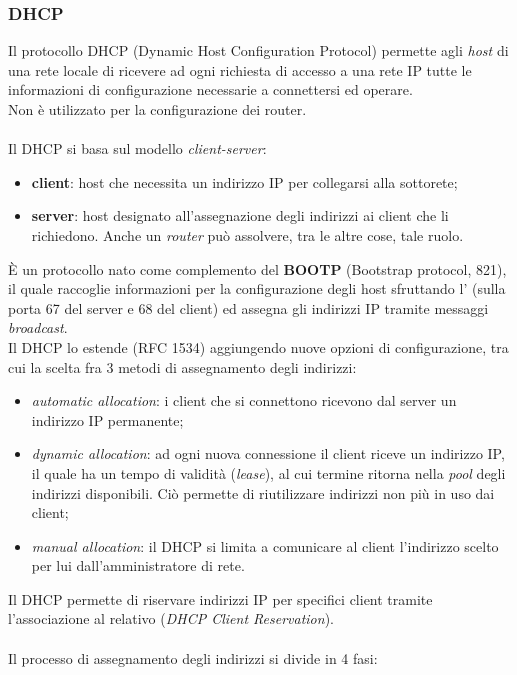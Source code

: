 \documentclass[a4paper,11pt]{article}
\def\subsub#1{\subsubsection{#1}\label{#1}}
\def\vedi#1{\nameref{#1}}
\def\italic#1{\textit{#1}}
\begin{document}
\subsub{DHCP} %
Il protocollo DHCP (Dynamic Host Configuration Protocol) permette agli \italic{host} di una rete locale di ricevere ad ogni richiesta di accesso a una rete IP tutte le informazioni di configurazione necessarie a connettersi ed operare.
\\Non è utilizzato per la configurazione dei router.
\\\\  Il DHCP si basa sul modello \italic{client-server}:
\begin{itemize}
	\item \textbf{client}:  host che necessita un indirizzo IP per collegarsi alla sottorete;
	\item \textbf{server}:  host designato all'assegnazione degli indirizzi ai client che li richiedono. Anche un \italic{router} può assolvere, tra le altre cose, tale ruolo.
\end{itemize}
È un protocollo nato come complemento del \textbf{BOOTP} (Bootstrap protocol, \vedi{RFC} 821), il quale raccoglie informazioni per la configurazione degli host sfruttando l'\vedi{UDP} (sulla porta 67 del server e 68 del client) ed assegna gli indirizzi IP tramite messaggi \italic{broadcast}.
\\Il DHCP lo estende (RFC 1534) aggiungendo nuove opzioni di configurazione, tra cui la scelta fra 3 metodi di assegnamento degli indirizzi:
\begin{itemize}
	\item \italic{automatic allocation}: i client che si connettono ricevono dal server un indirizzo IP permanente;
	\item \italic{dynamic allocation}: ad ogni nuova connessione il client riceve un indirizzo IP, il quale ha un tempo di validità (\italic{lease}), al cui termine ritorna nella \italic{pool} degli indirizzi disponibili. Ciò permette di riutilizzare indirizzi non più in uso dai client;
	\item \italic{manual allocation}: il DHCP si limita a comunicare al client l'indirizzo scelto per lui dall'amministratore di rete.
\end{itemize}
Il DHCP permette di riservare indirizzi IP per specifici client tramite l'associazione al relativo \vedi{Indirizzo MAC} (\italic{DHCP Client Reservation}).
\\\\Il processo di assegnamento degli indirizzi si divide in 4 fasi:
\end{document}
